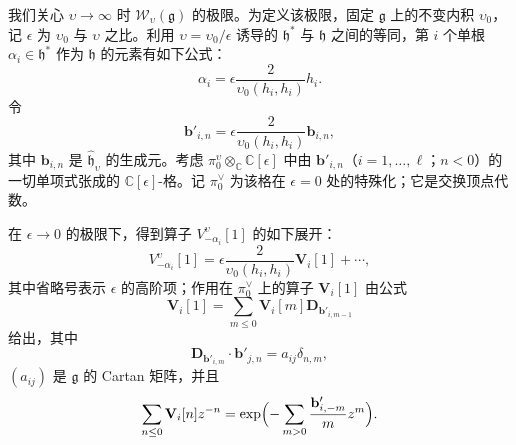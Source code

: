 我们关心 $\upsilon\to\infty$ 时 $\mathcal W_\upsilon(\mathfrak g)$ 的极限。为定义该极限，固定 $\mathfrak g$ 上的不变内积 $\upsilon_0$，记 $\epsilon$ 为 $\upsilon_0$ 与 $\upsilon$ 之比。利用 $\upsilon=\upsilon_0/\epsilon$ 诱导的 $\mathfrak h^*$ 与 $\mathfrak h$ 之间的等同，第 $i$ 个单根 $\alpha_i\in\mathfrak h^*$ 作为 $\mathfrak h$ 的元素有如下公式：
\[
    \alpha_i=\epsilon\frac{2}{\upsilon_0(h_i,h_i)}h_i.
\]
令
\begin{equation}
    \mathbf b'_{i,n}=\epsilon\frac{2}{\upsilon_0(h_i,h_i)}\mathbf b_{i,n},
    \tag{8.1-6}
\end{equation}
其中 $\mathbf b_{i,n}$ 是 $\hat{\mathfrak h}_\upsilon$ 的生成元。考虑 $\pi^\upsilon_0\otimes_{\mathbb C}\mathbb C[\epsilon]$ 中由 $\mathbf b'_{i,n}$（$i=1,\dots,\ell$；$n<0$）的一切单项式张成的 $\mathbb C[\epsilon]$-格。记 $\pi^\vee_0$ 为该格在 $\epsilon=0$ 处的特殊化；它是交换顶点代数。

在 $\epsilon\to0$ 的极限下，得到算子 $V^\upsilon_{-\alpha_i}[1]$ 的如下展开：
\[
    V^\upsilon_{-\alpha_i}[1]=\epsilon\frac{2}{\upsilon_0(h_i,h_i)}\mathbf V_i[1]+\cdots,
\]
其中省略号表示 $\epsilon$ 的高阶项；作用在 $\pi^\vee_0$ 上的算子 $\mathbf V_i[1]$ 由公式
\begin{equation}
    \mathbf V_i[1]=\sum_{m\le0}\mathbf V_i[m]\mathbf D_{\mathbf b'_{i,m-1}}
    \tag{8.1-7}
\end{equation}
给出，其中
\begin{equation}
    \mathbf D_{\mathbf b'_{i,m}}\cdot\mathbf b'_{j,n}=a_{ij}\delta_{n,m},
    \tag{8.1-8}
\end{equation}
$(a_{ij})$ 是 $\mathfrak g$ 的 Cartan 矩阵，并且
\[
    \sum_{n\le0}\mathbf V_i[n]z^{-n}=\exp\Bigl(-\sum_{m>0}\frac{\mathbf b'_{i,-m}}{m}z^m\Bigr).
\]


